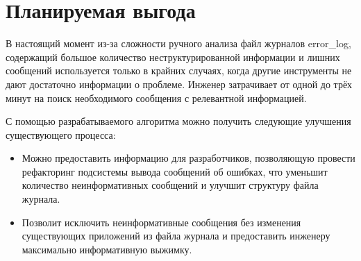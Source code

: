 \section{Планируемая выгода}

В настоящий момент из-за сложности ручного анализа файл журналов error\_log,
содержащий большое количество неструктурированной информации и
лишних сообщений используется только в крайних случаях, когда другие
инструменты не дают достаточно информации о проблеме. Инженер затрачивает
от одной до трёх минут на поиск необходимого сообщения с релевантной
информацией.

С помощью разрабатываемого алгоритма можно получить следующие улучшения
существующего процесса:

\begin{itemize}
  \item Можно предоставить информацию для разработчиков, позволяющую провести
    рефакторинг подсистемы вывода сообщений об ошибках, что уменьшит
    количество неинформативных сообщений и улучшит структуру файла журнала.
  \item Позволит исключить неинформативные сообщения без изменения существующих
    приложений из файла журнала и предоставить инженеру максимально
    информативную выжимку.
\end{itemize}
